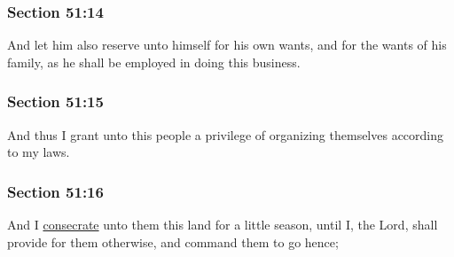 	\subsubsection{Section 51:14} %
		\label{DC51-14}

		And let him also reserve unto himself for his own wants, and for the wants of his family, as he shall be employed in doing this business.


	\subsubsection{Section 51:15} %
		\label{DC51-15}

		And thus I grant unto this people a privilege of organizing themselves according to my laws.


	\subsubsection{Section 51:16} %
		\label{DC51-16}

		And I \hyperref[CONSECRATION]{consecrate} unto them this land for a little season, until I, the Lord, shall provide for them otherwise, and command them to go hence;


